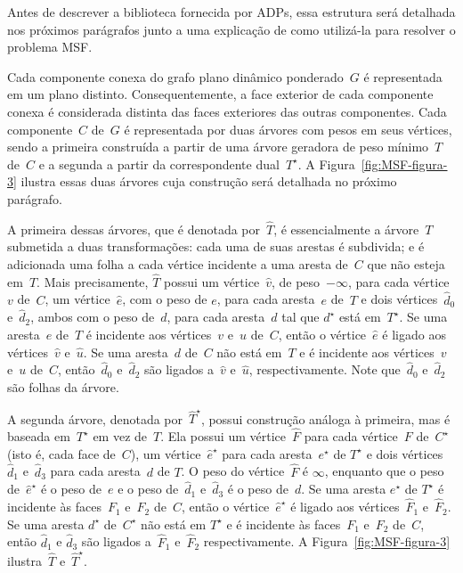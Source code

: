 Antes de descrever a biblioteca fornecida por ADPs, essa estrutura será detalhada nos próximos parágrafos junto a uma explicação de como utilizá-la para resolver o problema MSF.

Cada componente conexa do grafo plano dinâmico ponderado~$G$ é representada em um plano distinto.
Consequentemente, a face exterior de cada componente conexa é considerada distinta das faces exteriores das outras componentes.
Cada componente~$C$ de~$G$ é representada por duas árvores com pesos em seus vértices, sendo a primeira construída a partir de uma árvore geradora de peso mínimo~$T$ de~$C$ e a segunda a partir da correspondente dual~$T^\star$.
A Figura~\ref{fig:MSF-figura-3} ilustra essas duas árvores cuja construção será detalhada no próximo parágrafo.

A primeira dessas árvores, que é denotada por~$\hat T$, é essencialmente a árvore~$T$ submetida a duas transformações:
cada uma de suas arestas é subdivida; e é adicionada uma folha a cada vértice incidente a uma aresta de~$C$ que não esteja em~$T$.
Mais precisamente, $\hat T$ possui um vértice~$\hat v$, de peso~$-\infty$, para cada vértice~$v$ de~$C$, um vértice~$\hat e$, com o peso de $e$, para cada aresta~$e$ de~$T$ e dois vértices~$\hat d_0$ e~$\hat d_2$, ambos com o peso de~$d$, para cada aresta~$d$ tal que $d^\star$ está em~$T^\star$.
Se uma aresta~$e$ de~$T$ é incidente aos vértices~$v$ e~$u$ de~$C$, então o vértice~$\hat e$ é ligado aos vértices~$\hat v$ e~$\hat u$.
Se uma aresta~$d$ de~$C$ não está em~$T$ e é incidente aos vértices~$v$ e~$u$ de~$C$, então~$\hat d_0$ e~$\hat d_2$ são ligados a~$\hat v$ e~$\hat u$, respectivamente.
Note que~$\hat d_0$ e~$\hat d_2$ são folhas da árvore.

A segunda árvore, denotada por~$\hat T^\star$, possui construção análoga à primeira, mas é baseada em~$T^\star$ em vez de~$T$.
Ela possui um vértice~$\hat F$ para cada vértice~$F$ de~$C^\star$ (isto é, cada face de~$C$), um vértice~$\hat e^\star$ para cada aresta~$e^\star$ de $T^\star$ e dois vértices $\hat d_1$ e~$\hat d_3$ para cada aresta~$d$ de $T$.
O peso do vértice~$\hat F$ é $\infty$, enquanto que o peso de~$\hat e^\star$ é o peso de~$e$ e o peso de~$\hat d_1$ e~$\hat d_3$ é o peso de~$d$.
Se uma aresta $e^\star$ de $T^\star$ é incidente às faces~$F_1$ e~$F_2$ de~$C$, então o vértice~$\hat e^\star$ é ligado aos vértices~$\hat F_1$ e~$\hat F_2$.
Se uma aresta $d^\star$ de~$C^\star$ não está em $T^\star$ e é incidente às faces~$F_1$ e~$F_2$ de~$C$, então $\hat d_1$ e $\hat d_3$ são ligados a~$\hat F_1$ e~$\hat F_2$ respectivamente.
A Figura~\ref{fig:MSF-figura-3} ilustra~$\hat T$ e~$\hat T^\star$.

